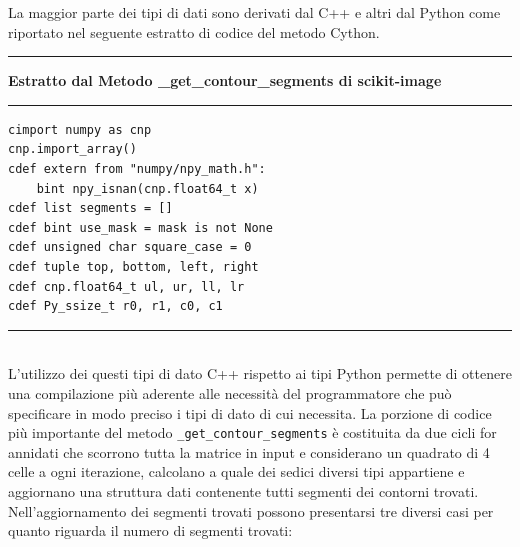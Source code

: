 \documentclass[12pt,a4paper]{report}
\begin{document}
La maggior parte dei tipi di dati sono derivati dal C++ e altri dal Python come riportato nel seguente estratto di codice del metodo Cython.  \newpage
\noindent\rule[0.5ex]{\linewidth}{2pt}
\small{\textbf{Estratto dal Metodo \_get\_contour\_segments di scikit-image}} \\
\noindent\rule[0.5ex]{\linewidth}{1pt}
\begin{lstlisting}
cimport numpy as cnp
cnp.import_array()
cdef extern from "numpy/npy_math.h":
    bint npy_isnan(cnp.float64_t x)
cdef list segments = []
cdef bint use_mask = mask is not None
cdef unsigned char square_case = 0
cdef tuple top, bottom, left, right
cdef cnp.float64_t ul, ur, ll, lr
cdef Py_ssize_t r0, r1, c0, c1
\end{lstlisting}
\noindent\rule[0.5ex]{\linewidth}{1pt} \\[10pt]
L'utilizzo dei questi tipi di dato C++ rispetto ai tipi Python permette di ottenere una compilazione più aderente alle necessità del programmatore che può specificare in modo preciso i tipi di dato di cui necessita. \newline
La porzione di codice più importante del metodo \verb|_get_contour_segments| è costituita da due cicli for annidati che scorrono tutta la matrice in input e considerano un quadrato di 4 celle a ogni iterazione, calcolano a quale dei sedici diversi tipi appartiene e aggiornano una struttura dati contenente tutti segmenti dei contorni trovati. \newline
Nell'aggiornamento dei segmenti trovati possono presentarsi tre diversi casi per quanto riguarda il numero di segmenti trovati:
\end{document}
